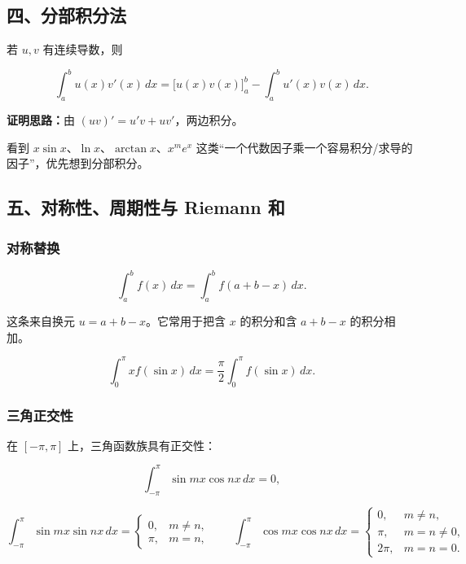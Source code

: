 \subsection*{四、分部积分法}

若 \(u,v\) 有连续导数，则

\[
      \int_a^b u(x)v'(x)\,dx
      =
      \bigl[u(x)v(x)\bigr]_a^b-\int_a^b u'(x)v(x)\,dx.
    \]

\textbf{证明思路：}由 \((uv)'=u'v+uv'\)，两边积分。

\begin{notebox}
看到 \(x\sin x\)、\(\ln x\)、\(\arctan x\)、\(x^m e^x\) 这类“一个代数因子乘一个容易积分/求导的因子”，优先想到分部积分。
\end{notebox}

\subsection*{五、对称性、周期性与 Riemann 和}

\subsubsection*{对称替换}

\[
      \int_a^b f(x)\,dx=\int_a^b f(a+b-x)\,dx.
    \]

这条来自换元 \(u=a+b-x\)。它常用于把含 \(x\) 的积分和含 \(a+b-x\) 的积分相加。

\[
      \int_0^\pi x f(\sin x)\,dx
      =
      \frac{\pi}{2}\int_0^\pi f(\sin x)\,dx.
    \]

\subsubsection*{三角正交性}

在 \([-\pi,\pi]\) 上，三角函数族具有正交性：

\[
      \int_{-\pi}^{\pi}\sin mx\cos nx\,dx=0,
    \]

\[
      \int_{-\pi}^{\pi}\sin mx\sin nx\,dx=
      \begin{cases}
      0,&m\ne n,\\
      \pi,&m=n,
      \end{cases}
      \qquad
      \int_{-\pi}^{\pi}\cos mx\cos nx\,dx=
      \begin{cases}
      0,&m\ne n,\\
      \pi,&m=n\ne0,\\
      2\pi,&m=n=0.
      \end{cases}
    \]

